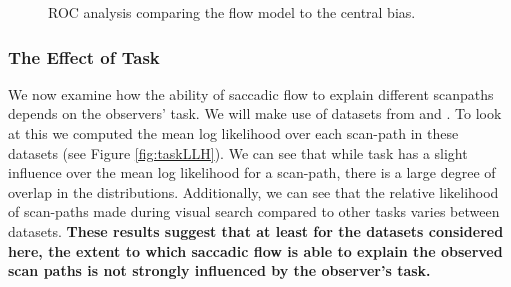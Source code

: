 \documentclass[a4paper, twocolumn, oneside, 11pt]{article}
\begin{document}
\begin{figure}
\centering
{}
\caption{ROC analysis comparing the flow model to the central bias.}
\label{fig:nFlowROC}
\end{figure}


\subsubsection{The Effect of Task}

We now examine how the ability of saccadic flow to explain different scanpaths depends on the observers' task. We will make use of datasets from \cite{mills2011} and \cite{koehler2014}. To look at this we computed the mean log likelihood over each scan-path in these datasets (see Figure \ref{fig:taskLLH}). We can see that while task has a slight influence over the mean log likelihood for a scan-path, there is a large degree of overlap in the distributions. Additionally, we can see that the relative likelihood of scan-paths made during visual search compared to other tasks varies between datasets. \textbf{These results suggest that at least for the datasets considered here, the extent to which saccadic flow is able to explain the observed scan paths is not strongly influenced by the observer's task.}
\end{document}
